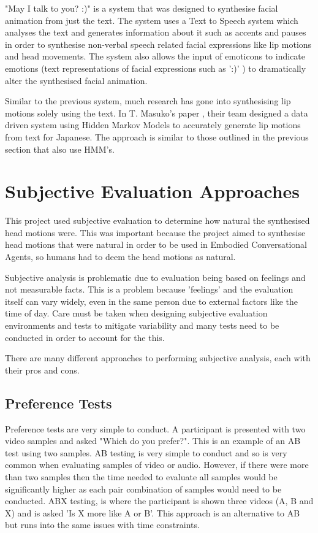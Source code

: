 \documentclass[bsc,frontabs,twoside,singlespacing,parskip,deptreport]{infthesis}
\begin{document}
"May I talk to you? :)"  \cite{may_i_talk_to_you} is a system that was designed to synthesise facial animation from just the text. The system uses a Text to Speech system which analyses the text and generates information about it such as accents and pauses in order to synthesise non-verbal speech related facial expressions like lip motions and head movements. The system also allows the input of emoticons to indicate emotions (text representations of facial expressions such as ':)' ) to dramatically alter the synthesised facial animation. 

Similar to the previous system, much research has gone into synthesising lip motions solely using the text. In T. Masuko's paper  \cite{lip_motion}, their team designed a data driven system using Hidden Markov Models to accurately generate lip motions from text for Japanese. The approach is similar to those outlined in the previous section that also use HMM's.

\section{Subjective Evaluation Approaches}

This project used subjective evaluation to determine how natural the synthesised head motions were. This was important because the project aimed to synthesise head motions that were natural in order to be used in Embodied Conversational Agents, so humans had to deem the head motions as natural.

Subjective analysis is problematic due to evaluation being based on feelings and not measurable facts. This is a problem because 'feelings' and the evaluation itself can vary widely, even in the same person due to external factors like the time of day. Care must be taken when designing subjective evaluation environments and tests to mitigate variability and many tests need to be conducted in order to account for the this. 

There are many different approaches to performing subjective analysis, each with their pros and cons. 

\subsection{Preference Tests}

Preference tests are very simple to conduct. A participant is presented with two video samples and asked "Which do you prefer?". This is an example of an AB test using two samples. AB testing is very simple to conduct and so is very common when evaluating samples of video or audio. However, if there were more than two samples then the time needed to evaluate all samples would be significantly higher as each pair combination of samples would need to be conducted. ABX testing, \cite{abx_testing} is where the participant is shown three videos (A, B and X) and is asked 'Is X more like A or B'. This approach is an alternative to AB but runs into the same issues with time constraints.
\end{document}
